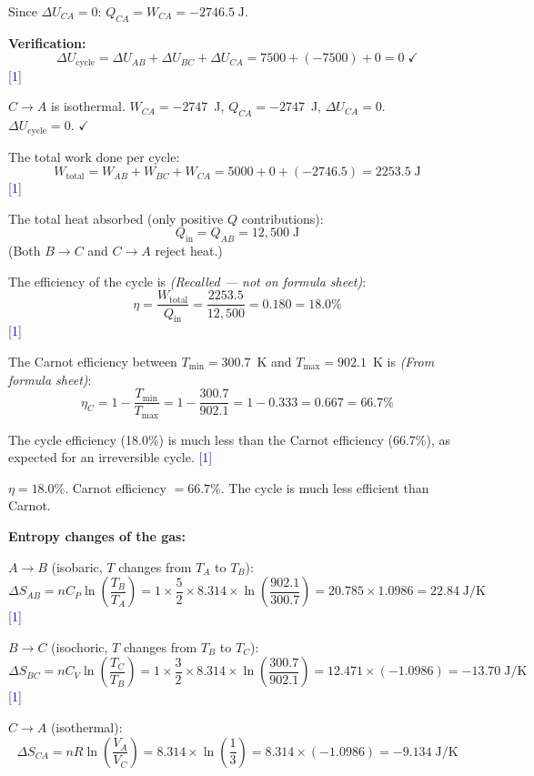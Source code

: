 \documentclass[12pt,a4paper]{article}
\newcommand{\markstep}[1]{\hfill\textcolor{blue}{[#1]}}
\newcommand{\finalanswer}[1]{%
  \begin{tcolorbox}[colback=green!5!white,colframe=green!50!black,boxrule=0.5pt]
  #1
  \end{tcolorbox}
}
\newcommand{\fromsheet}{\textit{(From formula sheet)}}
\newcommand{\recalled}{\textit{(Recalled --- not on formula sheet)}}
\begin{document}
\begin{parts}
Since $\Delta U_{CA} = 0$: $Q_{CA} = W_{CA} = -2746.5\;\text{J}$.

\textbf{Verification:}
\[
\Delta U_{\text{cycle}} = \Delta U_{AB} + \Delta U_{BC} + \Delta U_{CA} = 7500 + (-7500) + 0 = 0 \;\checkmark
\]
\markstep{1}

\finalanswer{$C\to A$ is isothermal. $W_{CA} = -2747$~J, $Q_{CA} = -2747$~J, $\Delta U_{CA} = 0$.\\
$\Delta U_{\text{cycle}} = 0$. $\checkmark$}

\item The total work done per cycle:
\[
W_{\text{total}} = W_{AB} + W_{BC} + W_{CA} = 5000 + 0 + (-2746.5) = 2253.5\;\text{J}
\]
\markstep{1}

The total heat absorbed (only positive $Q$ contributions):
\[
Q_{\text{in}} = Q_{AB} = 12{,}500\;\text{J}
\]
(Both $B\to C$ and $C\to A$ reject heat.)

The efficiency of the cycle is \recalled:
\[
\eta = \frac{W_{\text{total}}}{Q_{\text{in}}} = \frac{2253.5}{12{,}500} = 0.180 = 18.0\%
\]
\markstep{1}

The Carnot efficiency between $T_{\min} = 300.7$~K and $T_{\max} = 902.1$~K is \fromsheet:
\[
\eta_C = 1 - \frac{T_{\min}}{T_{\max}} = 1 - \frac{300.7}{902.1} = 1 - 0.333 = 0.667 = 66.7\%
\]

The cycle efficiency (18.0\%) is much less than the Carnot efficiency (66.7\%), as expected for an irreversible cycle. \markstep{1}

\finalanswer{$\eta = 18.0\%$. \quad Carnot efficiency $= 66.7\%$. \quad The cycle is much less efficient than Carnot.}

\item \textbf{Entropy changes of the gas:}

$A\to B$ (isobaric, $T$ changes from $T_A$ to $T_B$):
\[
\Delta S_{AB} = nC_P\ln\!\left(\frac{T_B}{T_A}\right) = 1\times\frac{5}{2}\times 8.314\times\ln\!\left(\frac{902.1}{300.7}\right) = 20.785\times 1.0986 = 22.84\;\text{J/K}
\]
\markstep{1}

$B\to C$ (isochoric, $T$ changes from $T_B$ to $T_C$):
\[
\Delta S_{BC} = nC_V\ln\!\left(\frac{T_C}{T_B}\right) = 1\times\frac{3}{2}\times 8.314\times\ln\!\left(\frac{300.7}{902.1}\right) = 12.471\times(-1.0986) = -13.70\;\text{J/K}
\]
\markstep{1}

$C\to A$ (isothermal):
\[
\Delta S_{CA} = nR\ln\!\left(\frac{V_A}{V_C}\right) = 8.314\times\ln\!\left(\frac{1}{3}\right) = 8.314\times(-1.0986) = -9.134\;\text{J/K}
\]


\end{parts}
\end{document}
